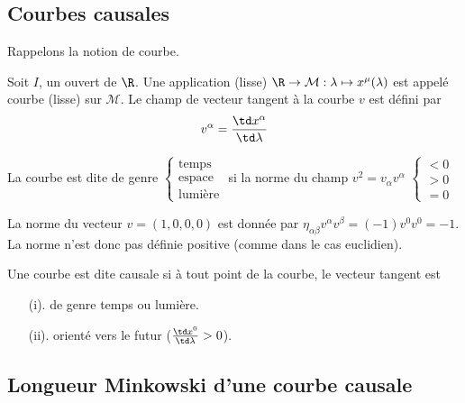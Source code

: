 \subsection{Courbes causales}
Rappelons la notion de courbe.
\begin{theoremframe}
    \begin{rap}
        Soit $I$, un ouvert de $\R$. Une application (lisse) $\R \to \mathcal{M}: \lambda \mapsto x^\mu (\lambda)$ est appelé courbe (lisse) sur $\mathcal{M}$. Le champ de vecteur tangent à la courbe $v$ est défini par
        \begin{equation}
            v^\alpha = \frac{\td x^\alpha}{\td \lambda}
        \end{equation}
    \end{rap}
\end{theoremframe}
La courbe est dite de genre $\left\{
\begin{array}{l}
 \text{temps} \\
 \text{espace}\\
 \text{lumière}
\end{array}
\right.$
si la norme du champ $ v^2 = v_{\alpha}v^{\alpha}$ 
$\left\{
\begin{array}{l}
 < 0 \\
 > 0\\
 = 0
\end{array}
\right.$
\\
\begin{exmp}
    La norme du vecteur $v = (1,0,0,0)$ est donnée par $\eta_{\alpha \beta}v^{\alpha} v^{\beta} = (-1)v^{0} v^{0} =-1$. La norme n'est donc pas définie positive (comme dans le cas euclidien).
\end{exmp}
\begin{theoremframe}
    \begin{defi}
        Une courbe est dite causale si à tout point de la courbe, le vecteur tangent est
        \begin{itemize}
            \item[(i).] de genre temps ou lumière.
            \item[(ii).] orienté vers le futur ($\frac{\td x^0}{\td\lambda}>0$).
        \end{itemize}
    \end{defi}
\end{theoremframe}
\subsection{Longueur Minkowski d'une courbe causale}

